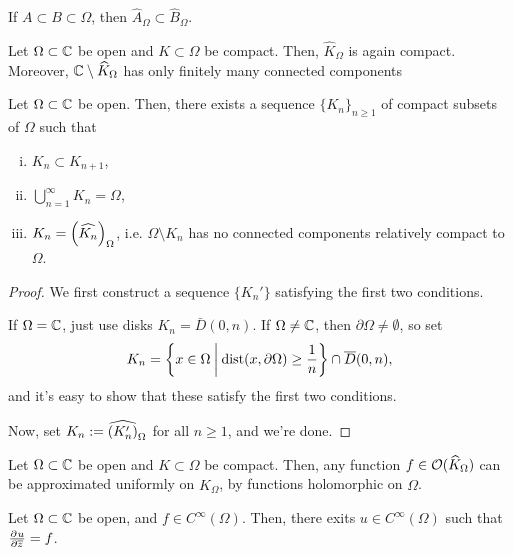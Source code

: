 \documentclass[11pt]{article}
\begin{document}
\begin{exercise}
    If $A \subset B \subset \Omega$, then $\hat A_\Omega \subset \hat B_\Omega$.
\end{exercise}

\begin{prop}
    Let $\Omega \subset \mathbb{C}$ be open and $K \subset \Omega$ be compact. Then, $\hat K_\Omega$ is again compact. Moreover, $\mathbb{C} \setminus \widehat K_\Omega$ has only finitely many connected components
\end{prop}

\begin{lem}[][label=lem:compact_seq]
    Let $\Omega \subset \mathbb{C}$ be open. Then, there exists a sequence $\{K_n\}_{n \geq 1}$ of compact subsets of $\Omega$ such that 
    \begin{enumerate}[(i)]
        \item $K_n \subset K_{n+1}$,
        \item $\bigcup_{n=1}^\infty K_n = \Omega$,
        \item $K_n = \left ( \widehat {K_n} \right )_\Omega$, i.e. $\Omega \setminus K_n$ has no connected components relatively compact to $\Omega$.
    \end{enumerate}
\end{lem}

\begin{proof}
    We first construct a sequence $\{K_n'\}$ satisfying the first two conditions. 

    If $\Omega = \mathbb{C}$, just use disks $K_n = \bar D(0,n)$. If $\Omega \neq \mathbb{C}$, then $\partial \Omega \neq \emptyset$, so set 
    $$K_n =\left \{ x \in \Omega \: \middle |\: \operatorname{dist}(x,\partial \Omega) \geq \frac{1}{n} \right \}\cap \overline D(0,n),$$
    and it's easy to show that these satisfy the first two conditions.

    Now, set $K_n := \widehat{\left ( K_n' \right )}_\Omega$ for all $n \geq 1$, and we're done.
\end{proof}

\begin{thm}
    Let $\Omega \subset \mathbb{C}$ be open and $K \subset \Omega$ be compact. Then, any function $f \in \mathcal O(\widehat K_\Omega)$ can be approximated uniformly on $\hat K_\Omega$, by functions holomorphic on $\Omega$.
\end{thm}

\begin{thm}
    Let $\Omega \subset \mathbb{C}$ be open, and $f \in C^\infty (\Omega)$. Then, there exits $u \in C^\infty (\Omega)$ such that $\frac{\partial^{}u}{\partial \overline z^{}}=f$.
\end{thm}
\end{document}
